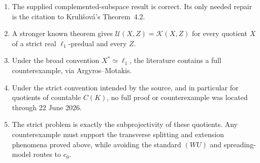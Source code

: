 \documentclass[11pt]{article}
\theoremstyle{definition}
\newcommand{\cU}{\mathcal U}
\newcommand{\cK}{\mathcal K}
\newcommand{\isom}{\simeq}
\begin{document}
\begin{enumerate}
\item The supplied complemented-subspace result is correct.  Its only needed
      repair is the citation to Kruli\v{s}ov\'a's Theorem~4.2.
\item A stronger known theorem gives $\cU(X,Z)=\cK(X,Z)$ for every quotient
      $X$ of a strict real $\ell_1$-predual and every $Z$.
\item Under the broad convention $X^*\isom\ell_1$, the literature contains a
      full counterexample, via Argyros--Motakis.
\item Under the strict convention intended by the source, and in particular
      for quotients of countable $C(K)$, no full proof or counterexample was
      located through 22 June 2026.
\item The strict problem is exactly the subprojectivity of these quotients.
      Any counterexample must support the transverse splitting and extension
      phenomena proved above, while avoiding the standard $(WU)$ and
      spreading-model routes to $c_0$.
\end{enumerate}
\end{document}
